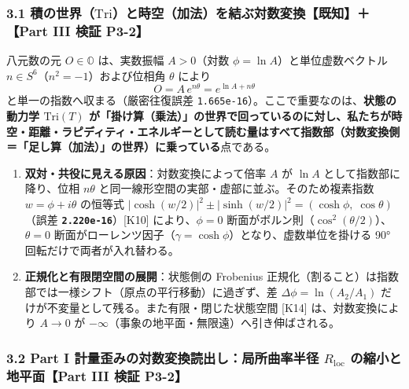 \documentclass[
  a4paper,
]{ltjsarticle}
\providecommand{\tightlist}{%
  \setlength{\itemsep}{0pt}\setlength{\parskip}{0pt}}
\begin{document}
\subsubsection{\texorpdfstring{3.1
積の世界（\(\mathrm{Tri}\)）と時空（加法）を結ぶ対数変換【既知】＋【Part
III 検証
P3-2】}{3.1 積の世界（\textbackslash mathrm\{Tri\}）と時空（加法）を結ぶ対数変換【既知】＋【Part III 検証 P3-2】}}\label{ux7a4dux306eux4e16ux754cmathrmtriux3068ux6642ux7a7aux52a0ux6cd5ux3092ux7d50ux3076ux5bfeux6570ux5909ux63dbux65e2ux77e5part-iii-ux691cux8a3c-p3-2}

八元数の元 \(O \in \mathbb{O}\) は、実数振幅 \(A > 0\)（対数
\(\phi = \ln A\)）と単位虚数ベクトル
\(n \in S^6\)（\(n^2 = -1\)）および位相角 \(\theta\) により
\[O = A\,e^{n\theta} = e^{\ln A + n\theta} \tag{2}\]
と単一の指数へ収まる（厳密往復誤差
\texttt{1.665e-16}）。ここで重要なのは、\textbf{状態の動力学
\(\mathrm{Tri}(T)\)
が「掛け算（乗法）」の世界で回っているのに対し、私たちが時空・距離・ラピディティ・エネルギーとして読む量はすべて指数部（対数変換側＝「足し算（加法）」の世界）に乗っている}点である。

\begin{enumerate}
\def\labelenumi{\arabic{enumi}.}
\tightlist
\item
  \textbf{双対・共役に見える原因}：対数変換によって倍率 \(A\) が
  \(\ln A\) として指数部に降り、位相 \(n\theta\)
  と同一線形空間の実部・虚部に並ぶ。そのため複素指数
  \(w = \phi + i\theta\) の恒等式
  \(|\cosh(w/2)|^2 \pm |\sinh(w/2)|^2 = (\cosh\phi,\; \cos\theta)\)（誤差
  \textbf{\texttt{2.220e-16}}）{[}K10{]} により、\(\phi=0\)
  断面がボルン則（\(\cos^2(\theta/2)\)）、\(\theta=0\)
  断面がローレンツ因子（\(\gamma = \cosh\phi\)）となり、虚数単位を掛ける
  90° 回転だけで両者が入れ替わる。
\item
  \textbf{正規化と有限閉空間の展開}：状態側の Frobenius
  正規化（割ること）は指数部では一様シフト（原点の平行移動）に過ぎず、差
  \(\Delta\phi = \ln(A_2/A_1)\)
  だけが不変量として残る。また有限・閉じた状態空間 {[}K14{]}
  は、対数変換により \(A \to 0\) が
  \(-\infty\)（事象の地平面・無限遠）へ引き伸ばされる。
\end{enumerate}

\subsubsection{\texorpdfstring{3.2 Part I
計量歪みの対数変換読出し：局所曲率半径 \(R_{\mathrm{loc}}\)
の縮小と地平面【Part III 検証
P3-2】}{3.2 Part I 計量歪みの対数変換読出し：局所曲率半径 R\_\{\textbackslash mathrm\{loc\}\} の縮小と地平面【Part III 検証 P3-2】}}\label{part-i-ux8a08ux91cfux6b6aux307fux306eux5bfeux6570ux5909ux63dbux8aadux51faux3057ux5c40ux6240ux66f2ux7387ux534aux5f84-r_mathrmloc-ux306eux7e2eux5c0fux3068ux5730ux5e73ux9762part-iii-ux691cux8a3c-p3-2}
\end{document}

